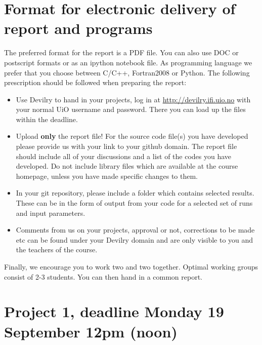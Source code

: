 \section*{Format for electronic delivery of report and programs}
%
The preferred format for the report is a PDF file. You can also
use DOC or postscript formats or as an ipython notebook file. 
As programming language we prefer that you choose between C/C++, Fortran2008 or Python.
The following prescription should be followed when preparing the report:
\begin{itemize}
\item Use Devilry to hand in your projects, log in  at 
\url{ http://devilry.ifi.uio.no} with your normal UiO username and password.
There you can load up the files within the deadline.
\item Upload {\bf only} the report file!  For the source code file(s) you have developed please provide us with your link to your github domain. 
The report file should include all of your discussions and a list of the codes you have developed. 
Do not include library files which are available at the course homepage, unless you have
made specific changes to them.
\item In your git repository, please include a folder which contains selected results. These can be in the form of output from your code
for a selected set of runs and input parameters. 
\item Comments  from us on your projects, approval or not, corrections to be made 
etc can be found under
your Devilry domain and are only visible to you and the teachers of the course.

\end{itemize}

Finally, 
we encourage you to work two and two together. Optimal working groups consist of 
2-3 students. You can then hand in a common report. 

\section*{Project 1, deadline Monday 19 September 12pm (noon)}


